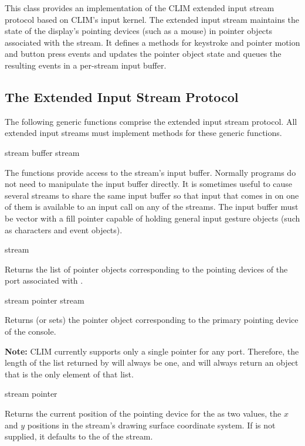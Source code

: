 This class provides an implementation of the CLIM extended input stream protocol
based on CLIM's input kernel.  The extended input stream maintains the state of
the display's pointing devices (such as a mouse) in pointer objects associated
with the stream.  It defines a  methods for keystroke and
pointer motion and button press events and updates the pointer object state and
queues the resulting events in a per-stream input buffer.

\Mutable


\subsection {The Extended Input Stream Protocol}

The following generic functions comprise the extended input stream protocol.
All extended input streams must implement methods for these generic functions.

 {stream}
 {buffer stream}

The functions provide access to the stream's input buffer.  Normally programs do
not need to manipulate the input buffer directly.  It is sometimes useful to
cause several streams to share the same input buffer so that input that comes in
on one of them is available to an input call on any of the streams.  The input
buffer must be vector with a fill pointer capable of holding general input
gesture objects (such as characters and event objects).

 {stream}

Returns the list of pointer objects corresponding to the pointing devices of the
port associated with .
\ReadOnly

 {stream}
 {pointer stream}

Returns (or sets) the pointer object corresponding to the primary pointing
device of the console.

{\bf Note:} CLIM currently supports only a single pointer for any port.
Therefore, the length of the list returned by  will always
be one, and  will always return an object that is the
only element of that list.

 {stream \key pointer}

Returns the current position of the pointing device  for the
  as two values, the $x$ and $y$
positions in the stream's drawing surface coordinate system.  If 
is not supplied, it defaults to the  of the stream.

